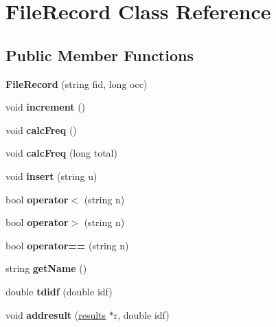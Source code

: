 \hypertarget{classFileRecord}{\section{File\-Record Class Reference}
\label{classFileRecord}
}
\subsection*{Public Member Functions}
\begin{DoxyCompactItemize}
\item 
\hypertarget{classFileRecord_a1fd39e086d42b1221436b697674586c3}{{\bfseries File\-Record} (string fid, long occ)}\label{classFileRecord_a1fd39e086d42b1221436b697674586c3}

\item 
\hypertarget{classFileRecord_af07a3c89d321c1c28dc182354e68f640}{void {\bfseries increment} ()}\label{classFileRecord_af07a3c89d321c1c28dc182354e68f640}

\item 
\hypertarget{classFileRecord_a84f4a499173ccea140e71db2d86ca26f}{void {\bfseries calc\-Freq} ()}\label{classFileRecord_a84f4a499173ccea140e71db2d86ca26f}

\item 
\hypertarget{classFileRecord_ae8ad365d0ae7fdc2735646895276c60b}{void {\bfseries calc\-Freq} (long total)}\label{classFileRecord_ae8ad365d0ae7fdc2735646895276c60b}

\item 
\hypertarget{classFileRecord_a955b21ffad6e113fb239e03168fbe2ec}{void {\bfseries insert} (string u)}\label{classFileRecord_a955b21ffad6e113fb239e03168fbe2ec}

\item 
\hypertarget{classFileRecord_a7a08d312cec8c4d4481198dffda96ce7}{bool {\bfseries operator$<$} (string n)}\label{classFileRecord_a7a08d312cec8c4d4481198dffda96ce7}

\item 
\hypertarget{classFileRecord_a5834e74b73af1e7143a2412d743541c5}{bool {\bfseries operator$>$} (string n)}\label{classFileRecord_a5834e74b73af1e7143a2412d743541c5}

\item 
\hypertarget{classFileRecord_a7f7a07ad1e1b5816a4a81e330edece2a}{bool {\bfseries operator==} (string n)}\label{classFileRecord_a7f7a07ad1e1b5816a4a81e330edece2a}

\item 
\hypertarget{classFileRecord_a40dffe9274bc7a1b3db80964d2342048}{string {\bfseries get\-Name} ()}\label{classFileRecord_a40dffe9274bc7a1b3db80964d2342048}

\item 
\hypertarget{classFileRecord_aec36cc33d2d566d218b756f16562ef47}{double {\bfseries tdidf} (double idf)}\label{classFileRecord_aec36cc33d2d566d218b756f16562ef47}

\item 
\hypertarget{classFileRecord_a63bc49eedc2fb23e0556ded36d2bc593}{void {\bfseries addresult} (\hyperlink{classresults}{results} $\ast$r, double idf)}\label{classFileRecord_a63bc49eedc2fb23e0556ded36d2bc593}

\end{DoxyCompactItemize}
